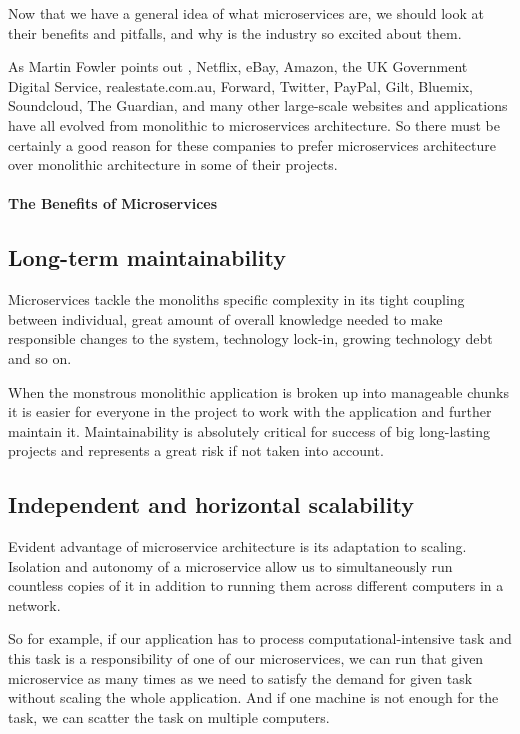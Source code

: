 \documentclass[12pt,oneside]{fithesis2}
\begin{document}
Now that we have a general idea of what microservices are, we should look at their benefits and pitfalls, and why is the industry so excited about them.

As Martin Fowler points out \cite{mf}, Netflix, eBay, Amazon, the UK Government Digital Service, realestate.com.au, Forward, Twitter, PayPal, Gilt, Bluemix, Soundcloud, The Guardian, and many other large-scale websites and applications have all evolved from monolithic to microservices architecture. So there must be certainly a good reason for these companies to prefer microservices architecture over monolithic architecture in some of their projects.

\paragraph{The Benefits of Microservices}

\subsection{Long-term maintainability}

Microservices tackle the monoliths specific complexity in its tight coupling between individual, great amount of overall knowledge needed to make responsible changes to the system, technology lock-in, growing technology debt and so on.

When the monstrous monolithic application is broken up into manageable chunks it is easier for everyone in the project to work with the application and further maintain it. Maintainability is absolutely critical for success of big long-lasting projects and represents a great risk if not taken into account.

\subsection{Independent and horizontal scalability}

Evident advantage of microservice architecture is its adaptation to scaling. Isolation and autonomy of a microservice allow us to simultaneously run countless copies of it in addition to running them across different computers in a network.

So for example, if our application has to process computational-intensive task and this task is a responsibility of one of our microservices, we can run that given microservice as many times as we need to satisfy the demand for given task without scaling the whole application. And if one machine is not enough for the task, we can scatter the task on multiple computers.
\end{document}

